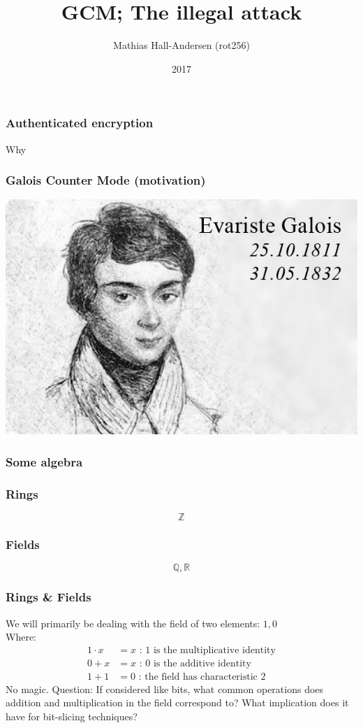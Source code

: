 \documentclass{beamer}
\title{GCM; The illegal attack}
\author{Mathias Hall-Andersen (rot256)}
\institute{Pwnies @ Copenhagen University}
\date{2017}
\begin{document}
\frame{\titlepage}

\begin{frame}
\frametitle{Authenticated encryption}
Why
\end{frame}

\begin{frame}
\frametitle{Galois Counter Mode (motivation)}
\includegraphics[width=\textwidth]{evariste_galois}
\end{frame}

\begin{frame}
\frametitle{Some algebra}
\end{frame}

\begin{frame}
\frametitle{Rings}
\[
    \mathbb{Z}
\]
\end{frame}

\begin{frame}
\frametitle{Fields}
\[
    \mathbb{Q}, \mathbb{R}
\]
\end{frame}

\begin{frame}
\frametitle{Rings \& Fields}
We will primarily be dealing with the field of two elements:
$1, 0$ \\
Where:
\begin{align}
    1 \cdot x &= x \text{ : 1 is the multiplicative identity} \\
    0 + x     &= x \text{ : 0 is the additive identity} \\
    1 + 1     &= 0 \text{ : the field has characteristic 2}
\end{align}
No magic.
Question:
If considered like bits, what common operations does
addition and multiplication in the field correspond to?
What implication does it have for bit-slicing techniques?
\end{frame}
\end{document}

